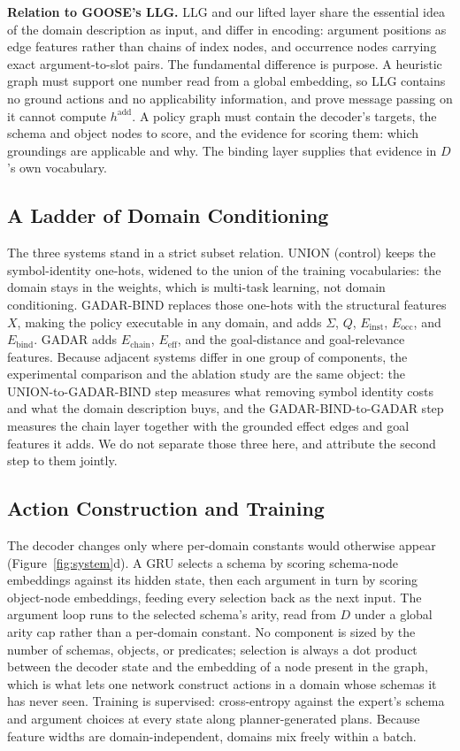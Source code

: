 \documentclass[letterpaper]{article} %
\newcommand{\gadar}{GADAR}                 %
\newcommand{\gadarbind}{\gadar{}-BIND}     %
\newcommand{\union}{UNION}                 %
\begin{document}
\textbf{Relation to GOOSE's LLG.} LLG and our lifted layer share the essential idea of the domain
description as input, and differ in encoding: argument positions as edge
features rather than chains of index nodes, and occurrence nodes carrying
exact argument-to-slot pairs. The fundamental difference is purpose. A
heuristic graph must support one number read from a global embedding, so
LLG contains no ground actions and no applicability information, and
\citet{goose_v2} prove message passing on it cannot compute
$h^{\mathrm{add}}$. A policy graph must contain the decoder's targets, the
schema and object nodes to score, and the evidence for scoring them: which
groundings are applicable and why. The binding layer supplies that evidence
in $D$'s own vocabulary.

\subsection{A Ladder of Domain Conditioning}

The three systems stand in a strict subset relation. \union{} (control)
keeps the symbol-identity one-hots, widened to the union of the training
vocabularies: the domain stays in the weights, which is multi-task
learning, not domain conditioning. \gadarbind{} replaces those one-hots
with the structural features $X$, making the policy executable in any
domain, and adds $\Sigma$, $Q$, $E_{\mathrm{inst}}$, $E_{\mathrm{occ}}$,
and $E_{\mathrm{bind}}$. \gadar{} adds $E_{\mathrm{chain}}$,
$E_{\mathrm{eff}}$, and the goal-distance and goal-relevance features.
Because adjacent systems differ in one group of components, the experimental
comparison and the ablation study are the same object: the
\union{}-to-\gadarbind{} step measures what removing symbol identity costs
and what the domain description buys, and the \gadarbind{}-to-\gadar{}
step measures the chain layer together with the grounded effect edges and
goal features it adds. We do not separate those three here, and attribute
the second step to them jointly.

\subsection{Action Construction and Training}

The decoder changes only where per-domain constants would otherwise appear
(Figure~\ref{fig:system}d). A GRU selects a schema by
scoring schema-node embeddings against its hidden state, then each argument
in turn by scoring object-node embeddings, feeding every selection back as
the next input. The argument loop runs to the selected schema's arity, read
from $D$ under a global arity cap rather than a per-domain constant. No
component is sized by the number of schemas, objects, or predicates;
selection is always a dot product between the decoder state and the
embedding of a node present in the graph, which is what lets one network
construct actions in a domain whose schemas it has never seen. Training is
supervised: cross-entropy against the expert's schema and argument
choices at every state along planner-generated plans. Because
feature widths are domain-independent, domains mix freely within a
batch.
\end{document}
